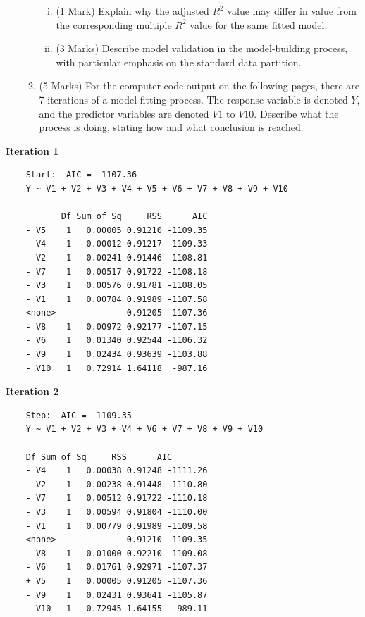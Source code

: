 \documentclass[a4paper,12pt]{article}
\begin{document}
\begin{enumerate}
\begin{enumerate}
\begin{enumerate}[(i)]
\item (1 Mark) Explain why the adjusted $R^2$ value may differ in value from the corresponding multiple $R^2$ value for the same fitted model.

	\item (3 Marks) Describe model validation in the model-building process, with particular emphasis on the standard data partition.
\end{enumerate}
\item (5 Marks) For the computer code output on the following pages, there are 7 iterations of a model fitting process. The response variable is denoted $Y$, and the predictor variables are denoted $V1$ to $V10$. Describe what the process is doing, stating how and what conclusion is reached. 
\end{enumerate}


\end{enumerate}


\noindent \textbf{Iteration 1}
\begin{framed}
	\begin{verbatim}
	Start:  AIC = -1107.36
	Y ~ V1 + V2 + V3 + V4 + V5 + V6 + V7 + V8 + V9 + V10
	
	       Df Sum of Sq     RSS      AIC
	- V5    1   0.00005 0.91210 -1109.35
	- V4    1   0.00012 0.91217 -1109.33
	- V2    1   0.00241 0.91446 -1108.81
	- V7    1   0.00517 0.91722 -1108.18
	- V3    1   0.00576 0.91781 -1108.05
	- V1    1   0.00784 0.91989 -1107.58
	<none>              0.91205 -1107.36
	- V8    1   0.00972 0.92177 -1107.15
	- V6    1   0.01340 0.92544 -1106.32
	- V9    1   0.02434 0.93639 -1103.88
	- V10   1   0.72914 1.64118  -987.16
	\end{verbatim}
\end{framed}
\newpage
\noindent \textbf{Iteration 2}
\begin{framed}
	\begin{verbatim}
	Step:  AIC = -1109.35
	Y ~ V1 + V2 + V3 + V4 + V6 + V7 + V8 + V9 + V10
	
	Df Sum of Sq     RSS      AIC
	- V4    1   0.00038 0.91248 -1111.26
	- V2    1   0.00238 0.91448 -1110.80
	- V7    1   0.00512 0.91722 -1110.18
	- V3    1   0.00594 0.91804 -1110.00
	- V1    1   0.00779 0.91989 -1109.58
	<none>              0.91210 -1109.35
	- V8    1   0.01000 0.92210 -1109.08
	- V6    1   0.01761 0.92971 -1107.37
	+ V5    1   0.00005 0.91205 -1107.36
	- V9    1   0.02431 0.93641 -1105.87
	- V10   1   0.72945 1.64155  -989.11
	\end{verbatim}
\end{framed}
\end{document}
